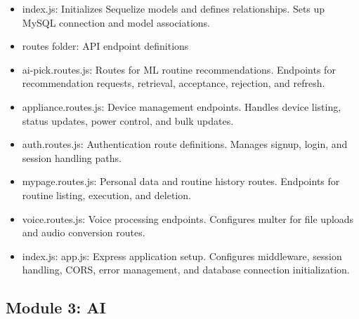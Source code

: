 \documentclass[conference]{IEEEtran}
\begin{document}
\begin{enumerate}[label=\arabic*]
\begin{itemize}[label=-]
        \item index.js: Initializes Sequelize models and defines relationships. Sets up MySQL connection and model associations.
        \vspace{0.7em}

        \item routes folder: API endpoint definitions
        \vspace{0.7em}

        \item ai-pick.routes.js: Routes for ML routine recommendations. Endpoints for recommendation requests, retrieval, acceptance, rejection, and refresh.
        \vspace{0.7em}

        \item appliance.routes.js: Device management endpoints. Handles device listing, status updates, power control, and bulk updates.
        \vspace{0.7em}

        \item auth.routes.js: Authentication route definitions. Manages signup, login, and session handling paths.
        \vspace{0.7em}

        \item mypage.routes.js: Personal data and routine history routes. Endpoints for routine listing, execution, and deletion.
        \vspace{0.7em}

        \item voice.routes.js: Voice processing endpoints. Configures multer for file uploads and audio conversion routes.
        \vspace{0.7em}

        \item index.js: app.js: Express application setup. Configures middleware, session handling, CORS, error management, and database connection initialization.
    \end{itemize}
\end{enumerate}

\vspace{0.7em} %

\subsection{Module 3: AI}
\vspace{0.5em}
\end{document}
